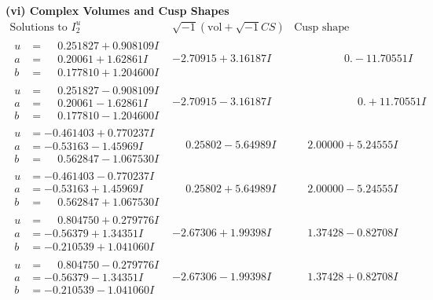 \documentclass[1p]{elsarticle_modified}
\theoremstyle{definition}
\newcommand{\I}{\sqrt{-1}}
\begin{document}
\newpage\flushleft \textbf{(vi) Complex Volumes and Cusp Shapes}
$$\begin{array}{c|c|c}  
\text{Solutions to }I^u_{2}& \I (\text{vol} + \sqrt{-1}CS) & \text{Cusp shape}\\
 \hline 
\begin{aligned}
u &= \phantom{-}0.251827 + 0.908109 I \\
a &= \phantom{-}0.20061 + 1.62861 I \\
b &= \phantom{-}0.177810 + 1.204600 I\end{aligned}
 & -2.70915 + 3.16187 I & \phantom{-0.000000 } 0. - 11.70551 I \\ \hline\begin{aligned}
u &= \phantom{-}0.251827 - 0.908109 I \\
a &= \phantom{-}0.20061 - 1.62861 I \\
b &= \phantom{-}0.177810 - 1.204600 I\end{aligned}
 & -2.70915 - 3.16187 I & \phantom{-0.000000 -}0. + 11.70551 I \\ \hline\begin{aligned}
u &= -0.461403 + 0.770237 I \\
a &= -0.53163 - 1.45969 I \\
b &= \phantom{-}0.562847 - 1.067530 I\end{aligned}
 & \phantom{-}0.25802 - 5.64989 I & \phantom{-}2.00000 + 5.24555 I \\ \hline\begin{aligned}
u &= -0.461403 - 0.770237 I \\
a &= -0.53163 + 1.45969 I \\
b &= \phantom{-}0.562847 + 1.067530 I\end{aligned}
 & \phantom{-}0.25802 + 5.64989 I & \phantom{-}2.00000 - 5.24555 I \\ \hline\begin{aligned}
u &= \phantom{-}0.804750 + 0.279776 I \\
a &= -0.56379 + 1.34351 I \\
b &= -0.210539 + 1.041060 I\end{aligned}
 & -2.67306 + 1.99398 I & \phantom{-}1.37428 - 0.82708 I \\ \hline\begin{aligned}
u &= \phantom{-}0.804750 - 0.279776 I \\
a &= -0.56379 - 1.34351 I \\
b &= -0.210539 - 1.041060 I\end{aligned}
 & -2.67306 - 1.99398 I & \phantom{-}1.37428 + 0.82708 I \\ \hline\begin{aligned}

\end{aligned}
\end{array}$$
\end{document}
